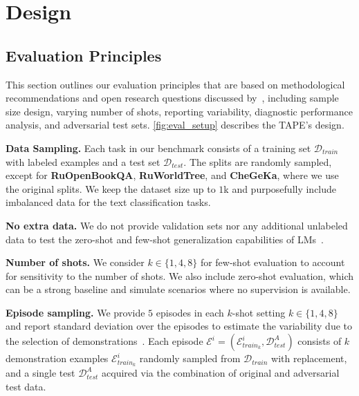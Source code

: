 \documentclass[11pt]{article}
\begin{document}
\section{Design}

\subsection{Evaluation Principles}
\label{sec:evaluation_principles}
This section outlines our evaluation principles that are based on methodological recommendations and open research questions discussed by~\citet{bragg2021flex,bowman-dahl-2021-will,beltagy-etal-2022-zero}, including sample size design, varying number of shots, reporting variability, diagnostic performance analysis, and adversarial test sets. \autoref{fig:eval_setup} describes the TAPE's design.


\vspace{0.1em}
\noindent\textbf{Data Sampling.} Each task in our benchmark consists of a training set $\mathcal{D}_{train}$ with labeled examples and a test set $\mathcal{D}_{test}$. The splits are randomly sampled, except for \textbf{RuOpenBookQA}, \textbf{RuWorldTree}, and \textbf{CheGeKa}, where we use the original splits. We keep the dataset size up to $1$k and purposefully include imbalanced data for the text classification tasks.

\vspace{0.1em}
\noindent\textbf{No extra data.} We do not provide validation sets nor any additional unlabeled data to test the zero-shot and few-shot generalization capabilities of LMs~\cite{bao2019few,tam-etal-2021-improving}. 
 
\vspace{0.1em}
\noindent\textbf{Number of shots.} We consider $k \in \{1, 4, 8\}$ for few-shot evaluation to account for sensitivity to the number of shots. We also include zero-shot evaluation, which can be a strong baseline and simulate scenarios where no supervision is available.

\vspace{0.1em}
\noindent\textbf{Episode sampling.} We provide $5$ episodes in each $k$-shot setting $k \in \{1, 4, 8\}$ and report standard deviation over the episodes to estimate the variability due to the selection of demonstrations~\cite{schick-schutze-2021-just}. Each episode $\mathcal{E}^i = (\mathcal{E}^i_{train_k}, \mathcal{D}^A_{test})$ consists of $k$ demonstration examples $\mathcal{E}^i_{train_k}$ randomly sampled from $\mathcal{D}_{train}$ with replacement, and a single test $\mathcal{D}^A_{test}$ acquired via the combination of original and adversarial test data.
\end{document}
